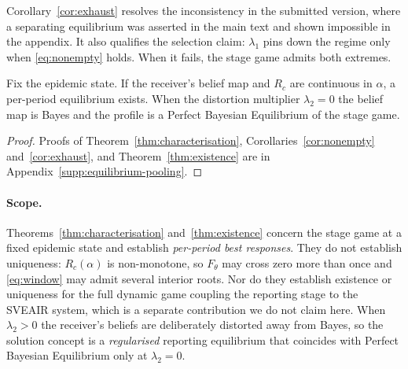 \documentclass[sigconf,review]{acmart}
\begin{document}
Corollary~\ref{cor:exhaust} resolves the inconsistency in the submitted version, where a
separating equilibrium was asserted in the main text and shown impossible in the appendix.
It also qualifies the selection claim: $\lambda_1$ pins down the regime only when
\eqref{eq:nonempty} holds. When it fails, the stage game admits both extremes.

\begin{theorem}[Existence]
\label{thm:existence}
Fix the epidemic state. If the receiver's belief map and $R_c$ are continuous in $\alpha$,
a per-period equilibrium exists. When the distortion multiplier $\lambda_2=0$ the belief
map is Bayes and the profile is a Perfect Bayesian Equilibrium of the stage game.
\end{theorem}

\begin{proof}
Proofs of Theorem~\ref{thm:characterisation}, Corollaries~\ref{cor:nonempty}
and~\ref{cor:exhaust}, and Theorem~\ref{thm:existence} are in
Appendix~\ref{supp:equilibrium-pooling}.
\end{proof}

\paragraph{Scope.}
Theorems~\ref{thm:characterisation} and~\ref{thm:existence} concern the stage game at a
fixed epidemic state and establish \emph{per-period best responses}. They do not establish
uniqueness: $R_c(\alpha)$ is non-monotone, so $F_\theta$ may cross zero more than once and
\eqref{eq:window} may admit several interior roots. Nor do they establish existence or
uniqueness for the full dynamic game coupling the reporting stage to the SVEAIR system,
which is a separate contribution we do not claim here. When $\lambda_2>0$ the receiver's
beliefs are deliberately distorted away from Bayes, so the solution concept is a
\emph{regularised} reporting equilibrium that coincides with Perfect Bayesian Equilibrium
only at $\lambda_2=0$.

\end{document}
